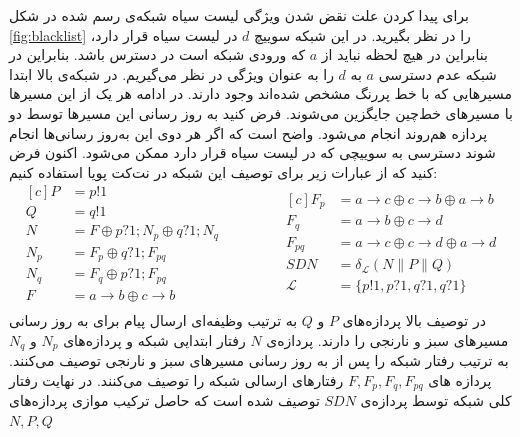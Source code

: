 \documentclass[
msc,
irfonts
]{./tex/tehran-thesis}
\newcommand{\پ}{پروژه/پایان‌نامه/رساله }
\theoremstyle{definition}
\theoremstyle{theorem}
\theoremstyle{definition}
\numberwithin{algorithm}{chapter}
\newcommand{\s}[1]{\{#1\}}
\newcommand{\ra}{\rightarrow}
\newcommand{\lf}[1]{\LTRfootnote{#1}}
\begin{document}
برای پیدا کردن علت نقض شدن ویژگی لیست سیاه شبکه‌ی رسم شده در شکل
\ref{fig:blacklist}
را در نظر بگیرید.
در این شبکه سوییچ
$d$
در لیست‌ سیاه قرار دارد، بنابراین در هیچ لحظه نباید از
$a$
که ورودی شبکه است در دسترس باشد.
بنابراین در شبکه عدم دسترسی 
$a$
به 
$d$
را به عنوان ویژگی در نظر می‌گیریم.
در شبکه‌ی بالا ابتدا مسیر‌هایی که با خط پررنگ مشخص شده‌اند وجود دارند.
در ادامه هر یک از این مسیرها با مسیر‌های خط‌چین جایگزین می‌شوند.
فرض کنید به روز رسانی این مسیر‌ها توسط دو پردازه هم‌روند انجام می‌شود.
واضح است که اگر هر دوی این به‌روز رسانی‌ها انجام شوند دسترسی به سوییچی که در لیست سیاه قرار دارد ممکن می‌شود.
اکنون فرض کنید که از عبارات زیر برای توصیف این شبکه در نت‌کت پویا استفاده کنیم:
\begin{equation*}
    \begin{aligned}[c]
        P   & = p!1                             \\
        Q   & = q!1                             \\
        N   & = F \oplus p?1;N_p \oplus q?1;N_q \\
        N_p & = F_p \oplus q?1;F_{pq}           \\
        N_q & = F_q \oplus p?1;F_{pq}           \\
        F   & = a\ra b \oplus c\ra b            \\
    \end{aligned}
    \qquad\qquad
    \begin{aligned}[c]
        F_p         & = a\ra c \oplus c\ra b \oplus a\ra b \\
        F_q         & = a\ra b \oplus c\ra d               \\
        F_{pq}      & = a\ra c \oplus c\ra d \oplus a\ra d \\
        SDN         & = \delta_{\mathcal{L}} (N
        \parallel P \parallel Q)                           \\
        \mathcal{L} & = \s{p!1,p?1,q?1,q?1}                \\
    \end{aligned}
\end{equation*}
در توصیف بالا پردازه‌های
$P$
و
$Q$
به ترتیب وظیفه‌ای ارسال پیام برای به روز رسانی مسیر‌های سبز و نارنجی را دارند.
پردازه‌ی
$N$
رفتار ابتدایی شبکه و پردازه‌های
$N_p$
و
$N_q$
به ترتیب رفتار شبکه را پس از به روز رسانی مسیر‌های سبز و نارنجی توصیف می‌کنند.
پردازه‌ های
$F,F_p,F_q,F_{pq}$
رفتارهای ارسالی\lf{Forwarding}
شبکه را توصیف می‌کنند.
در نهایت رفتار کلی شبکه توسط پردازه‌ی
$SDN$
توصیف شده است که حاصل ترکیب موازی پردازه‌های
$N,P,Q$
\end{document}
